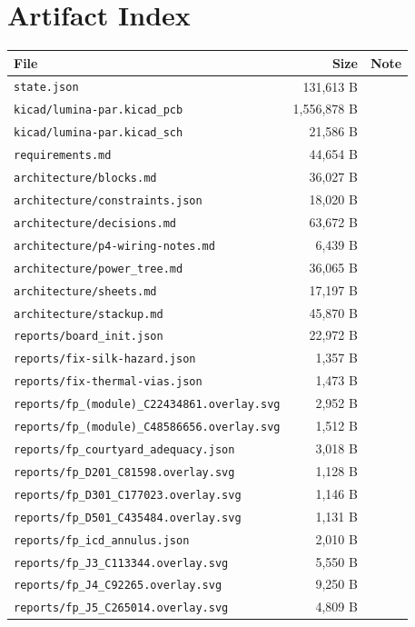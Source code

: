 \documentclass[11pt,a4paper]{article}
\begin{document}
\section{Artifact Index}
{\small
\begin{longtable}{p{9cm}rp{4cm}}
\toprule
\textbf{File} & \textbf{Size} & \textbf{Note} \\
\midrule
\endhead
\texttt{state.json} & 131,613 B &  \\
\texttt{kicad/lumina-par.kicad\_pcb} & 1,556,878 B &  \\
\texttt{kicad/lumina-par.kicad\_sch} & 21,586 B &  \\
\texttt{requirements.md} & 44,654 B &  \\
\texttt{architecture/blocks.md} & 36,027 B &  \\
\texttt{architecture/constraints.json} & 18,020 B &  \\
\texttt{architecture/decisions.md} & 63,672 B &  \\
\texttt{architecture/p4-wiring-notes.md} & 6,439 B &  \\
\texttt{architecture/power\_tree.md} & 36,065 B &  \\
\texttt{architecture/sheets.md} & 17,197 B &  \\
\texttt{architecture/stackup.md} & 45,870 B &  \\
\texttt{reports/board\_init.json} & 22,972 B &  \\
\texttt{reports/fix-silk-hazard.json} & 1,357 B &  \\
\texttt{reports/fix-thermal-vias.json} & 1,473 B &  \\
\texttt{reports/fp\_(module)\_C22434861.overlay.svg} & 2,952 B &  \\
\texttt{reports/fp\_(module)\_C48586656.overlay.svg} & 1,512 B &  \\
\texttt{reports/fp\_courtyard\_adequacy.json} & 3,018 B &  \\
\texttt{reports/fp\_D201\_C81598.overlay.svg} & 1,128 B &  \\
\texttt{reports/fp\_D301\_C177023.overlay.svg} & 1,146 B &  \\
\texttt{reports/fp\_D501\_C435484.overlay.svg} & 1,131 B &  \\
\texttt{reports/fp\_icd\_annulus.json} & 2,010 B &  \\
\texttt{reports/fp\_J3\_C113344.overlay.svg} & 5,550 B &  \\
\texttt{reports/fp\_J4\_C92265.overlay.svg} & 9,250 B &  \\
\texttt{reports/fp\_J5\_C265014.overlay.svg} & 4,809 B &  \\

\end{longtable}}
\end{document}
